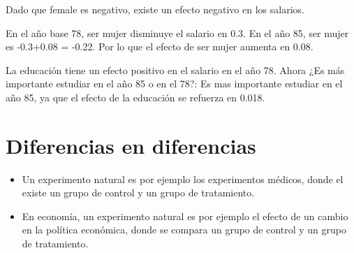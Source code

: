 Dado que female es negativo, existe un efecto negativo en los salarios. 

En el año base 78, ser mujer disminuye el salario en 0.3. En el año 85, ser mujer es -0.3+0.08 = -0.22. Por lo que el efecto de ser mujer aumenta en 0.08.

La educación tiene un efecto positivo en el salario en el año 78. Ahora ¿Es más importante estudiar en el año 85 o en el 78?: Es mas importante estudiar en el año 85, ya que el efecto de la educación se refuerza en 0.018.

\section{Diferencias en diferencias}

\begin{itemize}
    \item Un experimento natural es por ejemplo los experimentos médicos, donde el existe un grupo de control y un grupo de tratamiento.
    \item En economía, un experimento natural es por ejemplo el efecto de un cambio en la política económica, donde se compara un grupo de control y un grupo de tratamiento.
\end{itemize}
